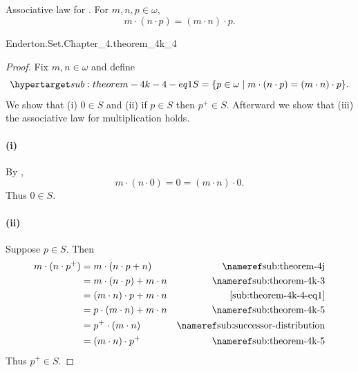 \documentclass{report}
\begin{document}
\subsection{}%

  \begin{theorem}[4K-4]
    Associative law for .
    For $m, n, p \in \omega$, $$m \cdot (n \cdot p) = (m \cdot n) \cdot p.$$
  \end{theorem}

    {Enderton.Set.Chapter\_4.theorem\_4k\_4}


  \begin{proof}

    Fix $m, n \in \omega$ and define
      \begin{equation}
        \hyperlabel{sub:theorem-4k-4-eq1}
        S = \{p \in \omega \mid m \cdot (n \cdot p) = (m \cdot n) \cdot p\}.
      \end{equation}
    We show that (i) $0 \in S$ and (ii) if $p \in S$ then $p^+ \in S$.
    Afterward we show that (iii) the associative law for multiplication holds.

    \paragraph{(i)}%

      By ,
        $$m \cdot (n \cdot 0) = 0 = (m \cdot n) \cdot 0.$$
      Thus $0 \in S$.

    \paragraph{(ii)}%

      Suppose $p \in S$.
      Then
        \begin{align*}
          m \cdot (n \cdot p^+)
            & = m \cdot (n \cdot p + n) & \textref{sub:theorem-4j} \\
            & = m \cdot (n \cdot p) + m \cdot n & \textref{sub:theorem-4k-3} \\
            & = (m \cdot n) \cdot p + m \cdot n & \eqref{sub:theorem-4k-4-eq1} \\
            & = p \cdot (m \cdot n) + m \cdot n & \textref{sub:theorem-4k-5} \\
            & = p^+ \cdot (m \cdot n) & \textref{sub:successor-distribution} \\
            & = (m \cdot n) \cdot p^+ & \textref{sub:theorem-4k-5}
        \end{align*}
      Thus $p^+ \in S$.


\end{proof}
\end{document}
